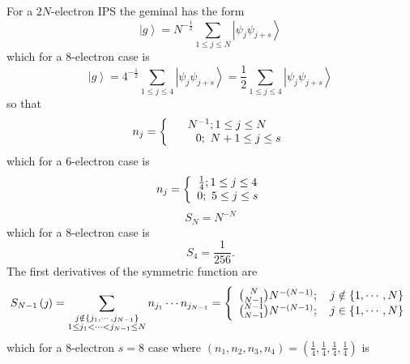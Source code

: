 \documentclass[aps,preprint]{revtex4}%
\begin{document}
For a $2N$-electron IPS the geminal has the form
\begin{equation}
\left\vert g\right\rangle =N^{-\frac{1}{2}}\sum_{1\leq j\leq N}\left\vert
\psi_{j}\psi_{j+s}\right\rangle
\end{equation}
which for a $8$-electron case is
\begin{equation}
\left\vert g\right\rangle =4^{-\frac{1}{2}}\sum_{1\leq j\leq4}\left\vert
\psi_{j}\psi_{j+s}\right\rangle =\frac{1}{2}\sum_{1\leq j\leq4}\left\vert
\psi_{j}\psi_{j+s}\right\rangle
\end{equation}
so that
\begin{equation}
n_{j}=\left\{
\begin{array}
[c]{c}%
N^{-1};1\leq j\leq N\\
\qquad0;\text{ }N+1\leq j\leq s
\end{array}
\right.
\end{equation}
which for a $6$-electron case is%
\begin{equation}
n_{j}=\left\{
\begin{array}
[c]{c}%
\frac{1}{4};1\leq j\leq4\\
0;\text{ }5\leq j\leq s
\end{array}
\right.
\end{equation}%
\begin{equation}
S_{N}=N^{-N}%
\end{equation}
which for a $8$-electron case is%
\begin{equation}
S_{4}=\frac{1}{256}.
\end{equation}
The first derivatives of the symmetric function are
\begin{equation}
S_{N-1}\left(  \jmath\right)  =\sum_{\substack{j\notin\left\{  j_{1}%
,\cdots,j_{N-1}\right\}  \\1\leq j_{1}<\cdots<j_{N-1}\leq N}}n_{j_{1}}\cdots
n_{j_{N-1}}=\left\{
\begin{array}
[c]{c}%
\binom{N}{N-1}N^{-\left(  N-1\right)  };\quad j\notin\left\{  1,\cdots
,N\right\} \\
\binom{N-1}{N-1}N^{-\left(  N-1\right)  };\quad j\in\left\{  1,\cdots
,N\right\}
\end{array}
\right.
\end{equation}
which for a $8$-electron $s=8$ case where $\left(  n_{1},n_{2},n_{3}%
,n_{4}\right)  =\left(  \frac{1}{4},\frac{1}{4},\frac{1}{4},\frac{1}%
{4}\right)  $ is%
\end{document}
